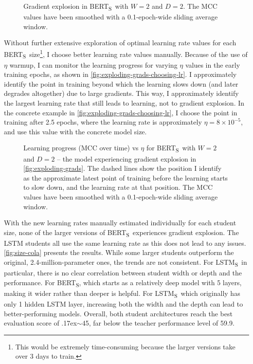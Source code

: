 \documentclass[bsc,frontabs,twoside,singlespacing,parskip,deptreport]{infthesis}
\def\mytilde{{\raise.17ex\hbox{$\scriptstyle\sim$}}}
\def\BERTS{BERT\textsubscript{S}}
\def\LSTMS{LSTM\textsubscript{S}}
\begin{document}
{{{{        \begin{figure}[h!t]
          \centering
          \caption{Gradient explosion in \BERTS~with $W=2$ and $D=2$. The MCC values have been smoothed with a 0.1-epoch-wide sliding average window.}
          \label{fig:exploding-grads}
        \end{figure}

        Without further extensive exploration of optimal learning rate values for each \BERTS~size\footnote{This would be extremely time-consuming because the larger versions take over 3 days to train.}, I choose better learning rate values manually.
        Because of the use of $\eta$ warmup, I can monitor the learning progress for varying $\eta$ values in the early training epochs, as shown in \autoref{fig:exploding-grads-choosing-lr}. I approximately identify the point in training beyond which the learning slows down (and later degrades altogether) due to large gradients. This way, I approximately identify the largest learning rate that still leads to learning, not to gradient explosion. In the concrete example in \autoref{fig:exploding-grads-choosing-lr}, I choose the point in training after 2.5 epochs, where the learning rate is approximately $\eta=8\times10^{-5}$, and use this value with the concrete model size.
        
        \begin{figure}[h!t]
          \centering
          \caption{Learning progress (MCC over time) vs $\eta$ for \BERTS~with $W=2$ and $D=2$ -- the model experiencing gradient explosion in \autoref{fig:exploding-grads}. The dashed lines show the position I identify as the approximate latest point of training before the learning starts to slow down, and the learning rate at that position.
          The MCC values have been smoothed with a 0.1-epoch-wide sliding average window.}
          \label{fig:exploding-grads-choosing-lr}
        \end{figure}

        With the new learning rates manually estimated individually for each student size, none of the larger versions of \BERTS~experiences gradient explosion. The LSTM students all use the same learning rate as this does not lead to any issues. \autoref{fig:size-cola} presents the results. While some larger students outperform the original, 2.4-million-parameter ones, the trends are not consistent. For \LSTMS~in particular, there is no clear correlation between student width or depth and the performance. For \BERTS, which starts as a relatively deep model with 5 layers, making it wider rather than deeper is helpful. For \LSTMS~which originally has only 1 hidden LSTM layer, increasing both the width and the depth can lead to better-performing models. Overall, both student architectures reach the best evaluation score of \mytilde45, far below the teacher performance level of 59.9. 

}}}}
\end{document}

